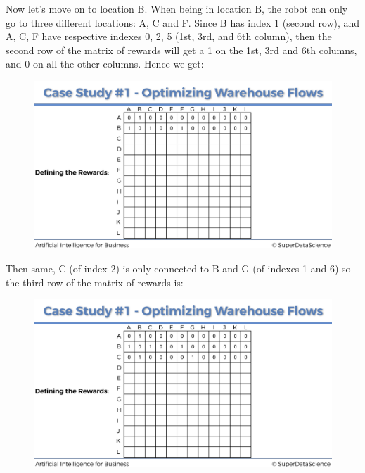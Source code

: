 \documentclass[]{book}
\begin{document}
\newpage

Now let's move on to location B. When being in location B, the robot can only go to three different locations: A, C and F. Since B has index 1 (second row), and A, C, F have respective indexes 0, 2, 5 (1st, 3rd, and 6th column), then the second row of the matrix of rewards will get a 1 on the 1st, 3rd and 6th columns, and 0 on all the other columns. Hence we get:

\begin{figure}[!htbp]
        \begin{center}
            \includegraphics[scale=0.175]{Rewards_Matrix_2.png}
        \end{center}
\end{figure}

Then same, C (of index 2) is only connected to B and G (of indexes 1 and 6) so the third row of the matrix of rewards is:

\begin{figure}[!htbp]
        \begin{center}
            \includegraphics[scale=0.175]{Rewards_Matrix_3.png}
        \end{center}
\end{figure}
\end{document}
